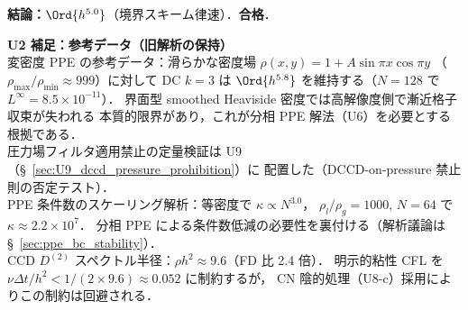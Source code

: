 \noindent\textbf{結論：}$\Ord{h^{5.0}}$（境界スキーム律速）．\textbf{合格}．

\medskip
\noindent\textbf{U2 補足：参考データ（旧解析の保持）}\\
\noindent\label{sec:verify_ppe_varrho}\label{sec:varrho_ppe_limitation}%
変密度 PPE の参考データ：滑らかな密度場 $\rho(x,y) = 1 + A\sin\pi x\cos\pi y$
（$\rho_{\max}/\rho_{\min} \approx 999$）に対して DC $k=3$ は
$\Ord{h^{5.8}}$ を維持する（$N = 128$ で $L^\infty = 8.5 \times 10^{-11}$）．
界面型 smoothed Heaviside 密度では高解像度側で漸近格子収束が失われる
本質的限界があり，これが分相 PPE 解法（U6）を必要とする根拠である．\\
\noindent\label{sec:verify_pressure_filter}%
圧力場フィルタ適用禁止の定量検証は U9（§~\ref{sec:U9_dccd_pressure_prohibition}）に
配置した（DCCD-on-pressure 禁止則の否定テスト）．\\
\noindent\label{sec:verify_ppe_condition}%
PPE 条件数のスケーリング解析：等密度で $\kappa \propto N^{3.0}$，
$\rho_l/\rho_g = 1000$, $N = 64$ で $\kappa \approx 2.2 \times 10^7$．
分相 PPE による条件数低減の必要性を裏付ける（解析議論は §~\ref{sec:ppe_bc_stability}）．\\
\noindent\label{sec:verify_ccd_spectral_radius}%
CCD $D^{(2)}$ スペクトル半径：$\rho h^2 \approx 9.6$（FD 比 2.4 倍）．
明示的粘性 CFL を $\nu\Delta t/h^2 < 1/(2 \times 9.6) \approx 0.052$ に制約するが，
CN 陰的処理（U8-c）採用によりこの制約は回避される．
